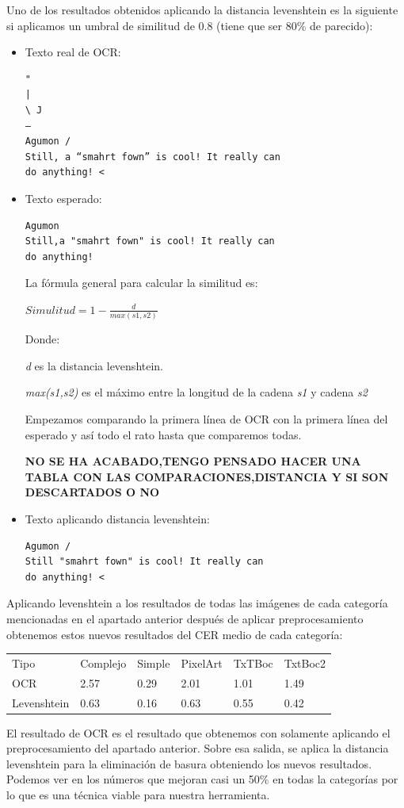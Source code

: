 Uno de los resultados obtenidos aplicando la distancia levenshtein es la siguiente si aplicamos un umbral de similitud de 0.8 (tiene que ser 80\% de parecido):
\begin{itemize}
\item Texto real de OCR:
\begin{verbatim}
"
|
\ J
—
Agumon /
Still, a “smahrt fown” is cool! It really can
do anything! <
\end{verbatim}
\item Texto esperado:
\begin{verbatim}
Agumon
Still,a "smahrt fown" is cool! It really can
do anything!
\end{verbatim}
La fórmula general para calcular la similitud es:

$Simulitud = 1-\frac{d}{max(s1,s2)} $ 

Donde:

\textit{d} es la distancia levenshtein.

\textit{max(s1,s2)}	 es el máximo entre la longitud de la cadena \textit{s1} y cadena \textit{s2}

Empezamos comparando la primera línea de OCR con la primera línea del esperado y así todo el rato hasta que comparemos todas.


\textbf{NO SE HA ACABADO,TENGO PENSADO HACER UNA TABLA CON LAS COMPARACIONES,DISTANCIA Y SI SON DESCARTADOS O NO}
\item Texto aplicando distancia levenshtein:
\begin{verbatim}
Agumon /
Still "smahrt fown" is cool! It really can 
do anything! <
\end{verbatim}
\end{itemize}  
Aplicando levenshtein a los resultados de todas las imágenes de cada categoría mencionadas en el apartado anterior después de aplicar preprocesamiento obtenemos estos nuevos resultados del CER medio de cada categoría:

\begin{table}[H]
\begin{tabular}{llllll}
Tipo        & Complejo & Simple & PixelArt & TxTBoc & TxtBoc2                      \\
OCR         & 2.57     & 0.29   & 2.01     & 1.01   & \cellcolor[HTML]{FFFFFF}1.49 \\
Levenshtein & 0.63     & 0.16   & 0.63     & 0.55   & 0.42                        
\end{tabular}
\end{table}
El resultado de OCR es el resultado que obtenemos con solamente aplicando el preprocesamiento del apartado anterior. Sobre esa salida, se aplica la distancia levenshtein para la eliminación de basura obteniendo los nuevos resultados. Podemos ver en los números que mejoran casi un 50\% en todas la categorías por lo que es una técnica viable para nuestra herramienta.
